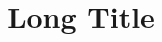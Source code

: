 \documentclass{beamer}
\begin{document}
\title[Short Title]{Long Title}
\author[]{}
\frame{\maketitle}
\end{document}
